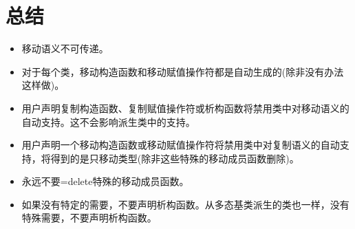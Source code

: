 \section{总结}
\begin{itemize}
	\item 移动语义不可传递。
	\item 对于每个类，移动构造函数和移动赋值操作符都是自动生成的(除非没有办法这样做)。
	\item 用户声明复制构造函数、复制赋值操作符或析构函数将禁用类中对移动语义的自动支持。这不会影响派生类中的支持。
	\item 用户声明一个移动构造函数或移动赋值操作符将禁用类中对复制语义的自动支持，将得到的是只移动类型(除非这些特殊的移动成员函数删除)。
	\item 永远不要=delete特殊的移动成员函数。
	\item 如果没有特定的需要，不要声明析构函数。从多态基类派生的类也一样，没有特殊需要，不要声明析构函数。
\end{itemize}


